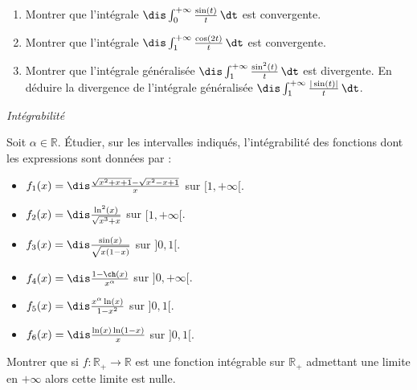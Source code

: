 \documentclass[a4paper,10pt]{report}
\begin{document}
\begin{Exa} \begin{enumerate}
\item Montrer que l'int\'egrale $\dis \int_0^{+ \infty} \frac{\sin(t)}{t}\, \dt$ est convergente.
\item Montrer que l'int\'egrale $\dis \int_1^{+\infty}\frac{\cos(2t)}{t}\, \dt$ est convergente.
\item Montrer que l'int\'egrale g\'en\'eralis\'ee $\dis \int_1^{+\infty}\frac{\sin^2(t)}{t} \, \dt$ est divergente. En d\'eduire la divergence de l'int\'egrale g\'en\'eralis\'ee $\dis \int_1^{+\infty}\frac{|\sin(t)|}{t} \, \dt$.
\end{enumerate}
\end{Exa}


\medskip

\begin{center}
\textit{{ {\large Intégrabilité}}}
\end{center}

\medskip

\begin{Exa} Soit $\alpha \in \mathbb{R}$. Étudier, sur les intervalles indiqués, l'int\'egrabilit\'e des fonctions dont les expressions sont données par :
\begin{multicols}{2}
\begin{itemize}
\item $f_1(x)=\dis\frac{\sqrt{x^2+x+1}-\sqrt{x^2-x+1}}{x}$ sur \newline $[1,+\infty[$.
\item $f_2(x)=\dis\frac{\ln^2(x)}{\sqrt{x^3+x}}$ sur $[1,+\infty[$.
\item $f_3(x)=\dis\frac{\sin(x)}{\sqrt{x(1-x)}}$ sur $]0,1[$.
\columnbreak
\item $f_4(x)=\dis\frac{1-\ch(x)}{x^{\alpha}}$ sur $]0,+\infty[$.
\item $f_5(x)=\dis\frac{x^{\alpha}\ln(x)}{1-x^2}$ sur $]0,1[$.
\item $f_6(x)=\dis\frac{\ln(x)\ln(1-x)}{x}$ sur $]0,1[$.
\end{itemize}
\end{multicols}

\vspace{0.1cm}
\end{Exa}



\begin{Exa} Montrer que si $f : \mathbb{R}_+ \rightarrow \mathbb{R}$ est une fonction intégrable sur $\mathbb{R}_+$ admettant une limite en $+ \infty$ alors cette limite est nulle. 
\end{Exa} 
\end{document}
